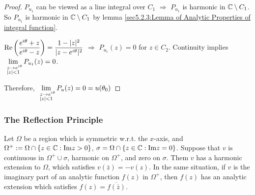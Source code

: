 \begin{proof}
     $ P_{u_1} $ can be viewed as a line integral over  $ C_1 $  $ \Rightarrow $  $ P_{u_1} $ is harmonic in  $ \mathbb C\setminus C_1 $. So  $ P_{u_1} $ is harmonic in  $ \mathbb C\setminus C_1 $ by lemma \ref{sec5.2.3:Lemma of Analytic Properties of integral function}.

    $ \displaystyle\mathrm{Re}\left(\frac{e^{i\theta}+z}{e^{i\theta}-z}\right)=\frac{1-|z|^2}{|z-e^{i\theta}|^2} $  $ \Rightarrow  $  $ P_{u_1}(z)=0 $ for  $ z\in C_2 $. Continuity  implies  $ \displaystyle \lim_{\substack{\,\,\,z\to e^{i\theta}\\|z|<1}} P_{u_1}(z)=0$.

    Therefore,  $ \displaystyle \lim_{\substack{\,\,\,z\to e^{i\theta}\\|z|<1}} P_{u}(z)=0=u(\theta_0) $ 
\end{proof}
\subsubsection{The Reflection Principle}
\begin{theorem}\label{thm:5.6.5:The reflection principle}
    Let  $ \Omega  $ be a region which is symmetric w.r.t. the  $ x $-axis, and  $ \Omega^+:=\Omega\cap\{z\in \mathbb C:\mathrm{Im} z>0\} $,  $ \sigma=\Omega\cap\{z\in \mathbb C:\mathrm{Im} z=0\} $. Suppose that  $  v  $ is continuous in  $ \Omega^+\cup\sigma $, harmonic on  $ \Omega^+ $, and  zero on  $ \sigma $. Them  $ v  $ has a harmonic extension to  $ \Omega $, which satisfies  $ v(\bar{z})=-v(z) $. In the same situation, if   $ v  $ is the imaginary part of an analytic function  $ f(z) $ in  $ \Omega^+ $, then  $ f(z)  $ has an analytic extension  which satisfies  $ f(z)=\overline{f(\bar{z})} $. 
\end{theorem}